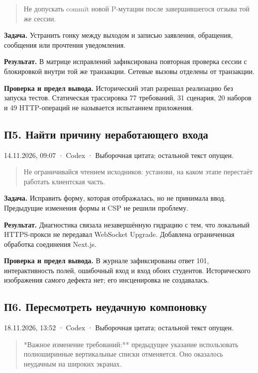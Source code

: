 \documentclass[11pt,a4paper]{article}
\newcommand{\source}[1]{{\small\color{muted}#1\par}}
\begin{document}
\begin{quote}\small Не допускать commit новой P-мутации после завершившегося отзыва той же сессии.\end{quote}

\textbf{Задача.} Устранить гонку между выходом и записью заявления, обращения, сообщения или прочтения уведомления.


\textbf{Результат.} В матрице исправлений зафиксирована повторная проверка сессии с блокировкой внутри той же транзакции. Сетевые вызовы отделены от транзакции.


\textbf{Проверка и предел вывода.} Исторический этап разрешал реализацию без запуска тестов. Статическая трассировка 77 требований, 31 сценария, 20 наборов и 49 HTTP-операций не называется испытанием приложения.


\clearpage

\subsection{П5. Найти причину неработающего входа}

\source{14.11.2026, 09:07 · Codex · Выборочная цитата; остальной текст опущен.}

\begin{quote}\small Не ограничивайся чтением исходников: установи, на каком этапе перестаёт работать клиентская часть.\end{quote}

\textbf{Задача.} Исправить форму, которая отображалась, но не принимала ввод. Предыдущие изменения формы и CSP не решили проблему.


\textbf{Результат.} Диагностика связала незавершённую гидрацию с тем, что локальный HTTPS-прокси не передавал WebSocket Upgrade. Добавлена ограниченная обработка соединения Next.js.


\textbf{Проверка и предел вывода.} В журнале зафиксированы ответ 101, интерактивность полей, ошибочный вход и вход обоих студентов. Исторического изображения самого дефекта нет; его инсценировка не создавалась.


\subsection{П6. Пересмотреть неудачную компоновку}

\source{18.11.2026, 13:52 · Codex · Выборочная цитата; остальной текст опущен.}

\begin{quote}\small **Важное изменение требований:** предыдущее указание использовать полноширинные вертикальные списки отменяется. Оно оказалось неудачным на широких экранах.\end{quote}
\end{document}
